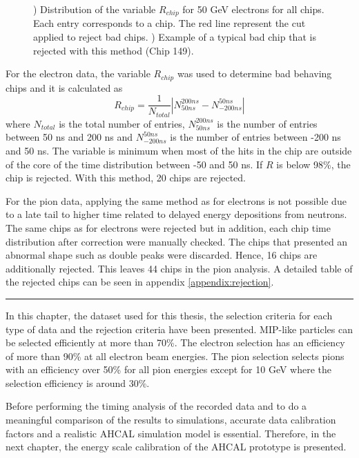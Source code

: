 \begin{figure}[htbp!]
\begin{subfigure}[t]{0.5\textwidth}
		\caption{} \label{fig:ExBadChip}
	\end{subfigure}
	\caption{) Distribution of the variable $R_{chip}$ for 50 GeV electrons for all chips. Each entry corresponds to a chip. The red line represent the cut applied to reject bad chips. ) Example of a typical bad chip that is rejected with this method (Chip 149).}
\end{figure}

For the electron data, the variable $R_{chip}$ was used to determine bad behaving chips and it is calculated as
\begin{equation} \label{eq:fraction_rejection}
	R_{chip} = \frac{1}{N_{total}} \left| N_{50 ns}^{200 ns} - N_{-200 ns}^{50 ns} \right|
\end{equation}
where $N_{total}$ is the total number of entries, $N_{50 ns}^{200 ns}$ is the number of entries between 50 ns and 200 ns and $N_{-200 ns}^{50 ns}$ is the number of entries between -200 ns and 50 ns. The variable is minimum when most of the hits in the chip are outside of the core of the time distribution between -50 and 50 ns. If $R$ is below 98\%, the chip is rejected. With this method, 20 chips are rejected.

For the pion data, applying the same method as for electrons is not possible due to a late tail to higher time related to delayed energy depositions from neutrons. The same chips as for electrons were rejected but in addition, each chip time distribution after correction were manually checked. The chips that presented an abnormal shape such as double peaks were discarded. Hence, 16 chips are additionally rejected. This leaves 44 chips in the pion analysis. A detailed table of the rejected chips can be seen in appendix \ref{appendix:rejection}.

\newpage
\begin{center}
  \rule{0.5\textwidth}{.4pt}
\end{center}

In this chapter, the dataset used for this thesis, the selection criteria for each type of data and the rejection criteria have been presented. MIP-like particles can be selected efficiently at more than 70\%. The electron selection has an efficiency of more than 90\% at all electron beam energies. The pion selection selects pions with an efficiency over 50\% for all pion energies except for 10 GeV where the selection efficiency is around 30\%.

Before performing the timing analysis of the recorded data and to do a meaningful comparison of the results to simulations, accurate data calibration factors and a realistic AHCAL simulation model is essential. Therefore, in the next chapter, the energy scale calibration of the AHCAL prototype is presented.

